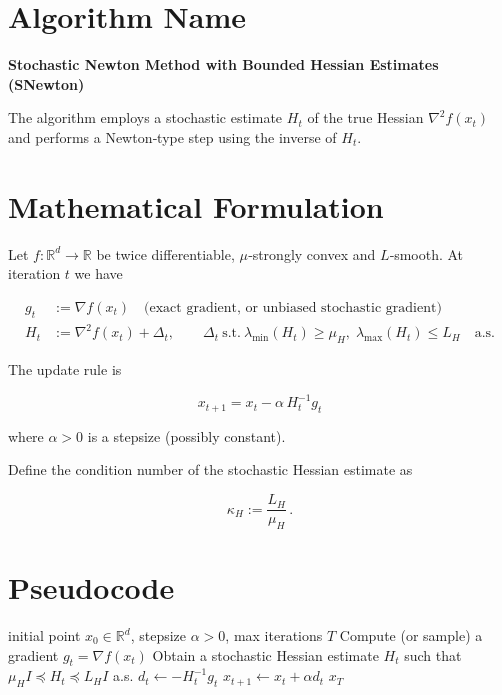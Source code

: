 \documentclass{article}
\newcommand{\R}{\mathbb{R}}
\begin{document}
\section*{Algorithm Name}
\textbf{Stochastic Newton Method with Bounded Hessian Estimates (SNewton)}  

The algorithm employs a stochastic estimate $H_t$ of the true Hessian $\nabla^2 f(x_t)$ and performs a Newton‑type step using the inverse of $H_t$.

\section*{Mathematical Formulation}
Let $f:\R^{d}\rightarrow\R$ be twice differentiable, $\mu$‑strongly convex and $L$‑smooth.  
At iteration $t$ we have

\[
\begin{aligned}
g_t &:= \nabla f(x_t) \quad\text{(exact gradient, or unbiased stochastic gradient)}\\[0.2em]
H_t &:= \nabla^2 f(x_t) + \Delta_t ,\qquad 
\Delta_t \ \text{s.t.}\ \lambda_{\min}(H_t)\ge \mu_H,\;
\lambda_{\max}(H_t)\le L_H \quad\text{a.s.}
\end{aligned}
\]

The update rule is

\[
\boxed{ \; x_{t+1}= x_t-\alpha\, H_t^{-1} g_t \; } \tag{1}
\]

where $\alpha>0$ is a stepsize (possibly constant).  

Define the condition number of the stochastic Hessian estimate as  

\[
\kappa_H := \frac{L_H}{\mu_H}\, .
\]

\section*{Pseudocode}
\begin{algorithm}[H]
\caption{Stochastic Newton (SNewton)}
\begin{algorithmic}[1]
\Require initial point $x_0\in\R^{d}$, stepsize $\alpha>0$, max iterations $T$
    \State Compute (or sample) a gradient $g_t = \nabla f(x_t)$
    \State Obtain a stochastic Hessian estimate $H_t$ such that
          $\mu_H I \preceq H_t \preceq L_H I$ a.s.
    \State $d_t \gets - H_t^{-1} g_t$ 
    \State $x_{t+1} \gets x_t + \alpha d_t$
\EndFor
\State \Return $x_T$
\end{algorithmic}
\end{algorithm}
\end{document}
